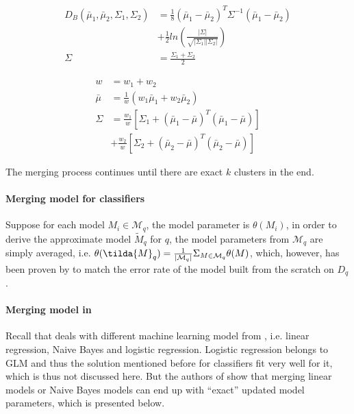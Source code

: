 \begin{equation}\label{eq: db_distance}
\begin{split}
    D_B(\bar{\mu}_1, \bar{\mu}_2, \Sigma_1, \Sigma_2) &=
    \frac{1}{8}(\bar{\mu}_1-\bar{\mu}_2)^T\Sigma^{-1}(\bar{\mu}_1 -\bar{\mu}_2) \\&+ \frac{1}{2}ln(\frac{|\Sigma|}{\sqrt{|\Sigma_1||\Sigma_2|}})\\
    \Sigma &= \frac{\Sigma_1 + \Sigma_2}{2}
\end{split}
\end{equation}

\begin{equation}\label{eq: GMM_merging}
    \begin{split}
        w &= w_1 + w_2\\
        \bar{\mu} &= \frac{1}{w}(w_1\bar{\mu}_1 + w_2\bar{\mu}_2)\\
        \Sigma &= \frac{w_1}{w}[\Sigma_1 + (\bar{\mu}_1 - \bar{\mu})^T(\bar{\mu}_1 -\bar{\mu})]\\
        &+\frac{w_2}{w}[\Sigma_2 + (\bar{\mu}_2 - \bar{\mu})^T(\bar{\mu}_2 -\bar{\mu})]
    \end{split}
\end{equation}

The merging process continues until there are exact $k$ clusters in the end.


\paragraph{Merging model for classifiers}
Suppose for each model $M_i \in \mathcal{M}_q$, the model parameter is $\theta(M_i)$, in order to derive the approximate model $\tilde{M}_q$ for $q$, the model parameters from $\mathcal{M}_q$ are simply averaged, i.e. $\theta(\tilda{M}_q) = \frac{1}{|\mathcal{M}_q|}\Sigma_{M \in \mathcal{M}_q}\theta(M)$, which, however, has been proven by \cite{zhang2012communication} to match the error rate of the model built from the scratch on $D_q$.

\paragraph{Merging model in \cite{gupta2015processing}} Recall that \cite{gupta1993maintaining} deals with different machine learning model from \cite{hasani2018efficient}, i.e. linear regression, Naive Bayes and logistic regression. Logistic regression belongs to GLM and thus the solution mentioned before for classifiers fit very well for it, which is thus not discussed here. But the authors of \cite{hasani2018efficient} show that merging linear models or Naive Bayes models can end up with ``exact'' updated model parameters, which is presented below.

